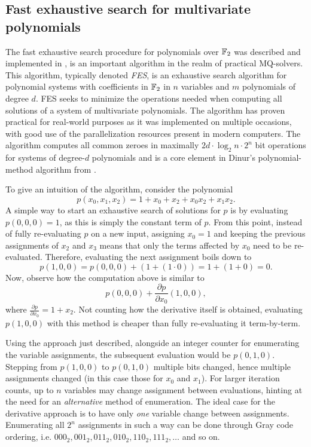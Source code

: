 \subsection{Fast exhaustive search for multivariate polynomials} \label{sec:prereq:fes}
The fast exhaustive search procedure for polynomials over $\mathbb{F}_2$ was described and implemented in \cite{ches-2010-23990, cryptoeprint:2013/436, tungchoumasters},
is an important algorithm in the realm of practical MQ-solvers. This algorithm, typically denoted \textit{FES}, is an exhaustive search algorithm for polynomial systems with coefficients in $\mathbb{F}_2$ in $n$ variables and $m$ polynomials of degree $d$. FES seeks to minimize the operations needed when computing all solutions of a system of multivariate polynomials. The algorithm has proven practical for real-world purposes as it was implemented on multiple occasions, with good use of the parallelization resources present in modern computers. The algorithm computes all common zeroes in maximally $2d\cdot \log_2n \cdot 2^n$ bit operations
for systems of degree-$d$ polynomials and is a core element in Dinur's polynomial-method algorithm from \cite{eurocrypt-2021-30841}.

To give an intuition of the algorithm, consider the polynomial
$$
    p(x_0, x_1, x_2) = 1 + x_0 + x_2 + x_0x_2 + x_1x_2.
$$
A simple way to start an exhaustive search of solutions for $p$ is by evaluating $p(0, 0, 0) = 1$, as this is simply the constant term of $p$. From this point, instead of fully re-evaluating $p$ on a new input, assigning $x_0 = 1$ and keeping the previous assignments of $x_2$ and $x_3$ means that only the terms affected by $x_0$ need to be re-evaluated. Therefore, evaluating the next assignment boils down to 
$$
    p(1, 0, 0) = p(0, 0, 0) + (1 + (1 \cdot 0)) = 1 + (1 + 0) = 0.
$$
Now, observe how the computation above is similar to 
$$
    p(0, 0, 0) + \frac{\partial p}{\partial x_0}(1, 0, 0),
$$
where $\frac{\partial p}{\partial x_0} = 1 + x_2$. Not counting how the derivative itself is obtained, evaluating $p(1, 0, 0)$ with this method is cheaper than fully re-evaluating it term-by-term.

Using the approach just described, alongside an integer counter for enumerating the variable assignments, the subsequent evaluation would be $p(0,1,0)$. Stepping from $p(1,0,0)$ to $p(0,1,0)$ multiple bits changed, hence multiple assignments changed (in this case those for $x_0$ and $x_1$). For larger iteration counts, up to $n$ variables may change assignment between evaluations, hinting at the need for an \textit{alternative} method of enumeration. The ideal case for the derivative approach is to have only \textit{one} variable change between assignments. Enumerating all $2^n$ assignments in such a way can be done through Gray code ordering, i.e. $000_2, 001_2, 011_2, 010_2, 110_2, 111_2, \dots$ and so on.

